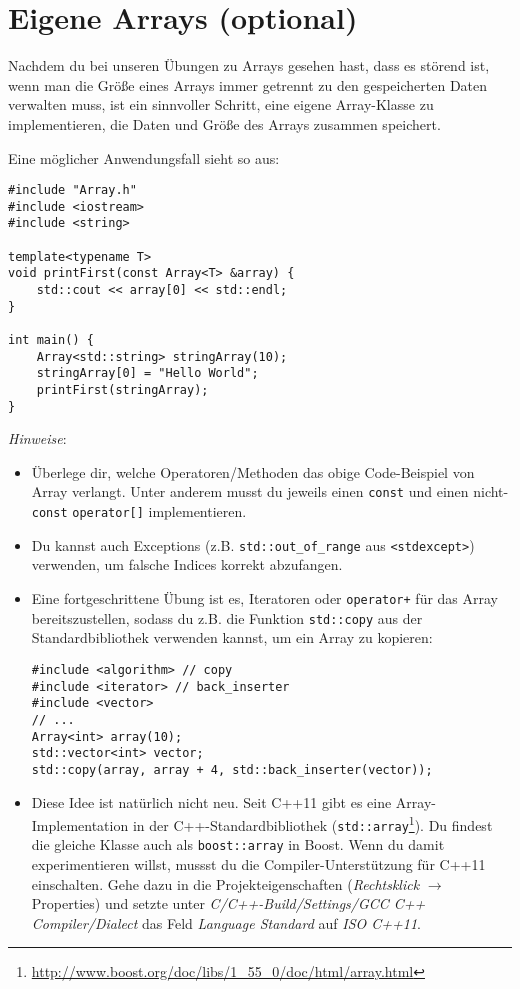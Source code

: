 \section{Eigene Arrays (optional)}
\label{sec:array}

Nachdem du bei unseren Übungen zu Arrays gesehen hast, dass es störend ist, wenn man die Größe eines Arrays immer getrennt zu den gespeicherten Daten verwalten muss, ist ein sinnvoller Schritt, eine eigene Array-Klasse zu implementieren, die Daten und Größe des Arrays zusammen speichert.

Eine möglicher Anwendungsfall sieht so aus:

\begin{lstlisting}
#include "Array.h"
#include <iostream>
#include <string>

template<typename T>
void printFirst(const Array<T> &array) {
    std::cout << array[0] << std::endl;
}

int main() {
    Array<std::string> stringArray(10);
    stringArray[0] = "Hello World";
    printFirst(stringArray);
}
\end{lstlisting}

\emph{Hinweise}:
\begin{itemize}
\item
Überlege dir, welche Operatoren/Methoden das obige Code-Beispiel von Array verlangt.
Unter anderem musst du jeweils einen \texttt{const} und einen nicht-\texttt{const} \texttt{operator[]} implementieren.

\item
Du kannst auch Exceptions (z.B. \texttt{std::out\_of\_range} aus \texttt{<stdexcept>}) verwenden, um falsche Indices korrekt abzufangen.

\item
Eine fortgeschrittene Übung ist es, Iteratoren oder \texttt{operator+} für das Array bereitszustellen, sodass du z.B. die Funktion \texttt{std::copy} aus der Standardbibliothek verwenden kannst, um ein Array zu kopieren:
\begin{lstlisting}
#include <algorithm> // copy
#include <iterator> // back_inserter
#include <vector>
// ...
Array<int> array(10);
std::vector<int> vector;
std::copy(array, array + 4, std::back_inserter(vector));
\end{lstlisting}

\item
Diese Idee ist natürlich nicht neu.
Seit C++11 gibt es eine Array-Implementation in der C++-Standardbibliothek (\texttt{std::array}\footnote{\url{http://www.boost.org/doc/libs/1_55_0/doc/html/array.html}}).
Du findest die gleiche Klasse auch als \texttt{boost::array} in Boost.
Wenn du damit experimentieren willst, mussst du die Compiler-Unterstützung für C++11 einschalten.
Gehe dazu in die Projekteigenschaften (\emph{Rechtsklick} $\to$ Properties) und setzte unter \emph{C/C++-Build/Settings/GCC C++ Compiler/Dialect} das Feld \emph{Language Standard} auf \emph{ISO C++11}.
\end{itemize}
